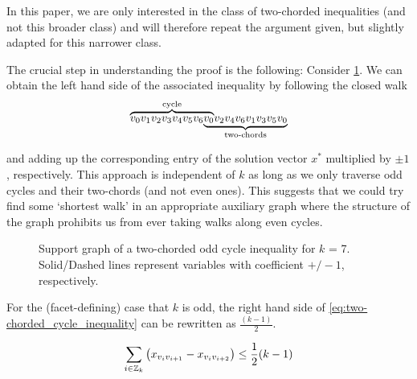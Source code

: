 In this paper, we are only interested in the class of two-chorded inequalities (and not this broader class) and will therefore repeat the argument given, but slightly adapted for this narrower class.

The crucial step in understanding the proof is the following:
Consider \cref{fig:support_graph_two-chorded_odd_cycle_inequality}.
We can obtain the left hand side of the associated inequality by following the closed walk
\[
\mathrlap{\overbrace{\phantom{v_{0} v_{1} v_{2} v_{3} v_{4} v_{5} v_{6} v_{0}}}^{\text{cycle}}}
v_{0} v_{1} v_{2} v_{3} v_{4} v_{5} v_{6}
\mathrlap{\underbrace{\phantom{v_{0} v_{2} v_{4} v_{6} v_{1} v_{3} v_{5} v_{0}}}_{\text{two-chords}}}
v_{0} v_{2} v_{4} v_{6} v_{1} v_{3} v_{5} v_{0}
\]


and adding up the corresponding entry of the solution vector $x^{*}$ multiplied by $\pm 1$, respectively.
This approach is independent of $k$ as long as we only traverse odd cycles and their two-chords (and not even ones).
This suggests that we could try find some ‘shortest walk’ in an appropriate auxiliary graph where the structure of the graph prohibits us from ever taking walks along even cycles.

\begin{figure}[H]
	\centering
	\caption[Support graph of a two-chorded odd cycle inequality]{Support graph of a two-chorded odd cycle inequality for $k$ = 7.
	Solid/Dashed lines represent variables with coefficient $+ / - 1$, respectively.}
	\label{fig:support_graph_two-chorded_odd_cycle_inequality}
\end{figure}


For the (facet-defining) case that $k$ is odd, the right hand side of \cref{eq:two-chorded_cycle_inequality} can be rewritten as $\frac{(k-1)}{2}$.

\begin{equation*}
	\sum_{i \in \mathbb{Z}_k} \left( x_{v_i v_{i+1}} - x_{v_i v_{i+2}} \right) \leq \frac{1}{2} (k-1)
\end{equation*}

